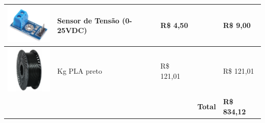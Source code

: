\begin{table}[H]
\begin{tabular}{ |>{\centering\arraybackslash} m{2.5cm}|>{\centering\arraybackslash} m{4cm} |>{\centering\arraybackslash} m{3cm} |>{\centering\arraybackslash} m{2.3cm} | >{\centering\arraybackslash} m{2.4cm} |}
\includegraphics[scale=0.6]{figuras/sensorTensao.png}                                              & Sensor de Tensão (0-25VDC)                                                                            & R\$ 4,50                                     & 2                                      & R\$ 9,00                                    \\ \hline
\rowcolor[HTML]{DBEEF3} 
\includegraphics[scale=0.6]{figuras/plaPreto.png}                                              & 1 Kg PLA preto                                                                            & R\$ 121,01                                     & 1                                      & R\$ 121,01                                    \\ \hline
\rowcolor[HTML]{DBEEF3} 
\multicolumn{1}{|l|}{\cellcolor[HTML]{DBEEF3}} & \multicolumn{1}{l|}{\cellcolor[HTML]{DBEEF3}}                                                      & \multicolumn{1}{l|}{\cellcolor[HTML]{DBEEF3}} & \cellcolor[HTML]{00FF00}\textbf{Total} & \cellcolor[HTML]{00FF00}\textbf{R\$ 834,12} \\ \hline
\end{tabular}
\end{table}







































